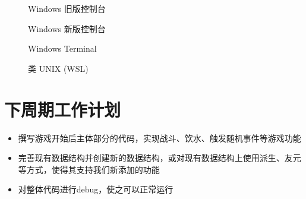 \documentclass[hyperref,UTF8,a4paper]{ctexart}
\providecommand{\tightlist}{%
  \setlength{\itemsep}{0pt}\setlength{\parskip}{0pt}}
\newcommand{\includegraphicx}[1]{\maxsizebox{\textwidth}{\textheight}{\texttt{[image: \#1]}}}
\begin{document}
\begin{figure}[H]
\centering
\includegraphicx{img/cmd.png}
\caption{Windows 旧版控制台}
\end{figure}

\begin{figure}[H]
\centering
\includegraphicx{img/conhost.png}
\caption{Windows 新版控制台}
\end{figure}

\begin{figure}[H]
\centering
\includegraphicx{img/wt.png}
\caption{Windows Terminal}
\end{figure}

\begin{figure}[H]
\centering
\includegraphicx{img/wsl.png}
\caption{类 UNIX (WSL)}
\end{figure}

\hypertarget{ux4e0bux5468ux671fux5de5ux4f5cux8ba1ux5212}{%
\section{下周期工作计划}\label{ux4e0bux5468ux671fux5de5ux4f5cux8ba1ux5212}}

\begin{itemize}
\tightlist
\item
  撰写游戏开始后主体部分的代码，实现战斗、饮水、触发随机事件等游戏功能
\item
  完善现有数据结构并创建新的数据结构，或对现有数据结构上使用派生、友元等方式，使得其支持我们新添加的功能
\item
  对整体代码进行debug，使之可以正常运行
\end{itemize}
\end{document}
